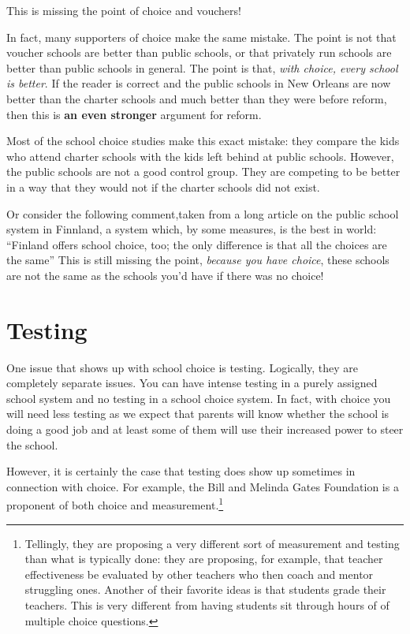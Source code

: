 This is missing the point of choice and vouchers!

In fact, many supporters of choice make the same mistake. The point is not that
voucher schools are better than public schools, or that privately run schools
are better than public schools in general. The point is that, \emph{with
choice, every school is better}. If the reader is correct and the public
schools in New Orleans are now better than the charter schools and much better
than they were before reform, then this is \textbf{an even stronger} argument
for reform.

Most of the school choice studies make this exact mistake: they compare the
kids who attend charter schools with the kids left behind at public schools.
However, the public schools are not a good control group. They are competing to
be better in a way that they would not if the charter schools did not exist.

Or consider the following comment,taken from a long article on the public
school system in Finnland,
a system which, by some measures, is the best in world: ``Finland offers school
choice, too; the only difference is that all the choices are the same''
This is still missing the point, \emph{because you have choice}, these schools
are not the same as the schools you'd have if there was no choice!

\section{Testing}


One issue that shows up with school choice is testing. Logically, they are
completely separate issues. You can have intense testing in a purely assigned
school system and no testing in a school choice system. In fact, with choice
you will need less testing as we expect that parents will know whether the
school is doing a good job and at least some of them will use their increased
power to steer the school.

However, it is certainly the case that testing does show up sometimes in
connection with choice. For example, the Bill and Melinda Gates Foundation is a
proponent of both choice and measurement.\footnote{Tellingly, they are
proposing a very different sort of measurement and testing than what is
typically done: they are proposing, for example, that teacher effectiveness be
evaluated by other teachers who then coach and mentor struggling ones. Another
of their favorite ideas is that students grade their teachers. This is very
different from having students sit through hours of of multiple choice
questions.}

